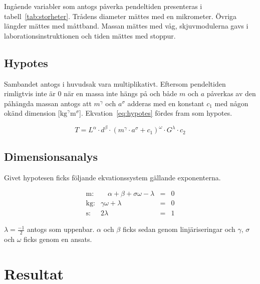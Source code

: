 \documentclass[a4paper,12pt]{article}
\begin{document}
Ingående variabler som antogs påverka pendeltiden presenteras i
tabell~\ref{tab:storheter}. Trådens diameter mättes med en mikrometer. Övriga
längder mättes med måttband.  Massan mättes med våg, skjuvmodulerna gavs i
laborationsinstruktionen och tiden mättes med stoppur.

\subsection{Hypotes}

Sambandet antogs i huvudsak vara multiplikativt. Eftersom pendeltiden rimligtvis
inte är 0 när en massa inte hängs på och både $m$ och $a$ påverkas av den
påhängda massan antogs att $m^\gamma$ och $a^\sigma$ adderas med en konstant
$c_1$ med någon okänd dimension [$\si{\kilogram}^\gamma\si{\meter}^\sigma$].
Ekvation~\eqref{eq:hypotes} fördes fram som hypotes.

\begin{equation}
  T = L^\alpha \cdot d^\beta \cdot (m^\gamma \cdot a^\sigma + c_1)^\omega \cdot G^\lambda \cdot c_2
  \label{eq:hypotes}
\end{equation}

\subsection{Dimensionsanalys}

Givet hypotesen ficks följande ekvationssystem gällande exponenterna.

\begin{equation}
  \begin{array}{rrcc}
    \text{m:} & \hspace{1em} \alpha + \beta + \sigma \omega - \lambda & = & 0 \\
    \text{kg:} & \gamma \omega + \lambda & = & 0 \\
    \text{s:} & 2\lambda & = & 1
  \end{array}
  \label{eq:system}
\end{equation}

$\lambda = \frac{-1}{2}$ antogs som uppenbar. $\alpha$ och $\beta$ ficks sedan genom
linjäriseringar och $\gamma$, $\sigma$ och $\omega$ ficks genom en ansats.


\section{Resultat}
\end{document}
